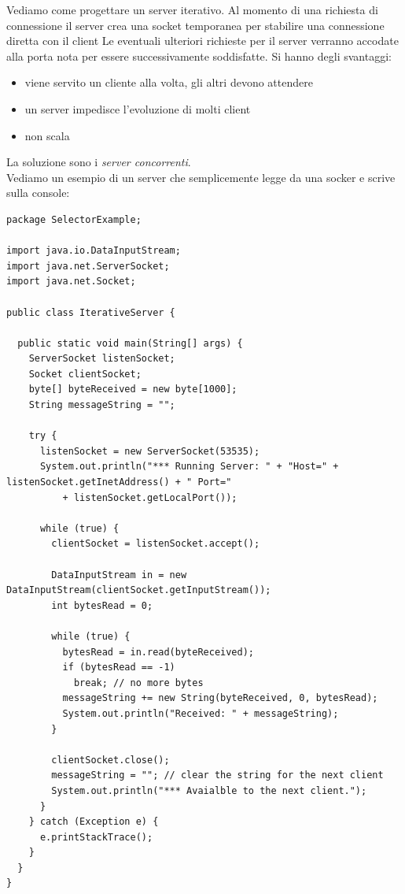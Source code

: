 \documentclass[a4paper,12pt, oneside]{book}
\begin{document}
Vediamo come progettare un server iterativo. Al momento di una richiesta di connessione il server crea una
socket temporanea per stabilire una connessione diretta con il client Le eventuali ulteriori richieste per il server verranno accodate alla porta nota per essere successivamente soddisfatte. Si hanno degli svantaggi:
\begin{itemize}
	\item viene servito un cliente alla volta, gli altri devono attendere
	\item un server impedisce l'evoluzione di molti client
	\item non scala
\end{itemize}
La soluzione sono i \textit{server concorrenti}.\\
Vediamo un esempio di un server che semplicemente legge da una socker e scrive sulla console:
\begin{verbatim}
package SelectorExample;

import java.io.DataInputStream;
import java.net.ServerSocket;
import java.net.Socket;

public class IterativeServer {

  public static void main(String[] args) {
    ServerSocket listenSocket;
    Socket clientSocket;
    byte[] byteReceived = new byte[1000];
    String messageString = "";

    try {
      listenSocket = new ServerSocket(53535);
      System.out.println("*** Running Server: " + "Host=" + listenSocket.getInetAddress() + " Port="
          + listenSocket.getLocalPort());

      while (true) {
        clientSocket = listenSocket.accept();

        DataInputStream in = new DataInputStream(clientSocket.getInputStream());
        int bytesRead = 0;

        while (true) {
          bytesRead = in.read(byteReceived);
          if (bytesRead == -1)
            break; // no more bytes
          messageString += new String(byteReceived, 0, bytesRead);
          System.out.println("Received: " + messageString);
        }

        clientSocket.close();
        messageString = ""; // clear the string for the next client
        System.out.println("*** Avaialble to the next client.");
      }
    } catch (Exception e) {
      e.printStackTrace();
    }
  }
}

\end{verbatim}
\newpage
\end{document}
